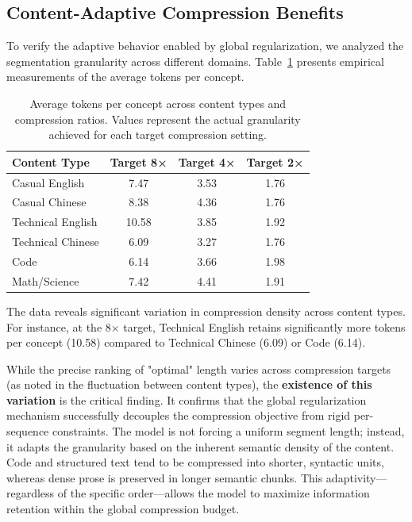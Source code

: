\subsection{Content-Adaptive Compression Benefits}

To verify the adaptive behavior enabled by global regularization, we analyzed the segmentation granularity across different domains. Table~\ref{tab:compression_stats} presents empirical measurements of the average tokens per concept.

\begin{table}[h]
\centering
\begin{tabular}{lccc}
\hline
\textbf{Content Type} & \textbf{Target 8×} & \textbf{Target 4×} & \textbf{Target 2×} \\
\hline
Casual English    & 7.47 & 3.53 & 1.76 \\
Casual Chinese    & 8.38 & 4.36 & 1.76 \\
Technical English & 10.58 & 3.85 & 1.92 \\
Technical Chinese & 6.09 & 3.27 & 1.76 \\
Code              & 6.14 & 3.66 & 1.98 \\
Math/Science      & 7.42 & 4.41 & 1.91 \\
\hline
\end{tabular}
\caption{Average tokens per concept across content types and compression ratios. Values represent the actual granularity achieved for each target compression setting.}
\label{tab:compression_stats}
\end{table}

The data reveals significant variation in compression density across content types. For instance, at the 8× target, Technical English retains significantly more tokens per concept (10.58) compared to Technical Chinese (6.09) or Code (6.14). 

While the precise ranking of "optimal" length varies across compression targets (as noted in the fluctuation between content types), the \textbf{existence of this variation} is the critical finding. It confirms that the global regularization mechanism successfully decouples the compression objective from rigid per-sequence constraints. The model is not forcing a uniform segment length; instead, it adapts the granularity based on the inherent semantic density of the content. Code and structured text tend to be compressed into shorter, syntactic units, whereas dense prose is preserved in longer semantic chunks. This adaptivity—regardless of the specific order—allows the model to maximize information retention within the global compression budget.
